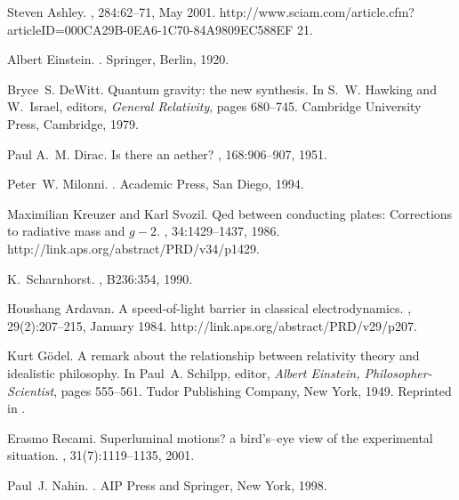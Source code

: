 %
%
%


\begin{thebibliography}{10}

Steven Ashley.
, 284:62--71, May 2001.
\newblock
  http://www.sciam.com/article.cfm?articleID=000CA29B-0EA6-1C70-84A9809EC588EF%
21.

Albert Einstein.
.
\newblock Springer, Berlin, 1920.

Bryce~S. DeWitt.
\newblock Quantum gravity: the new synthesis.
\newblock In S.~W. Hawking and W.~Israel, editors, {\em General Relativity},
  pages 680--745. Cambridge University Press, Cambridge, 1979.

Paul A.~M. Dirac.
\newblock Is there an aether?
, 168:906--907, 1951.

Peter~W. Milonni.
.
\newblock Academic Press, San Diego, 1994.

Maximilian Kreuzer and Karl Svozil.
\newblock Qed between conducting plates: Corrections to radiative mass and
  $g-2$.
, 34:1429--1437, 1986.
\newblock http://link.aps.org/abstract/PRD/v34/p1429.

K.~Scharnhorst.
, B236:354, 1990.

Houshang Ardavan.
\newblock A speed-of-light barrier in classical electrodynamics.
, 29(2):207--215, January 1984.
\newblock http://link.aps.org/abstract/PRD/v29/p207.

Kurt G{\"{o}}del.
\newblock A remark about the relationship between relativity theory and
  idealistic philosophy.
\newblock In Paul~A. Schilpp, editor, {\em {A}lbert {E}instein,
  {P}hilosopher-{S}cientist}, pages 555--561. Tudor Publishing Company, New
  York, 1949.
\newblock Reprinted in \cite[pp. 202-207]{godel-ges2}.

Erasmo Recami.
\newblock Superluminal motions? a bird's--eye view of the experimental
  situation.
, 31(7):1119--1135, 2001.

Paul~J. Nahin.
.
\newblock AIP Press and Springer, New York, 1998.


\end{thebibliography}

